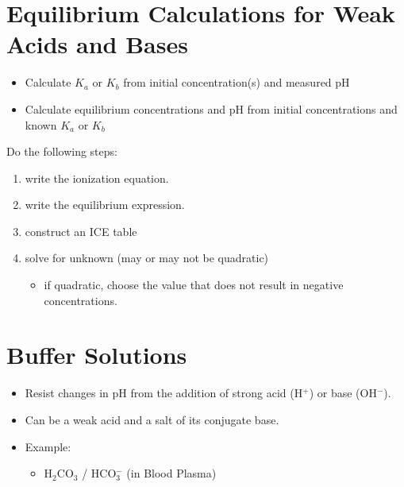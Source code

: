 \documentclass[10pt]{article}
\begin{document}
\section*{Equilibrium Calculations for Weak Acids and Bases}
\begin{itemize}
    \item Calculate $K_a$ or $K_b$ from initial concentration(s) and measured pH
    \item Calculate equilibrium concentrations and pH from initial concentrations and known $K_a$ or $K_b$
\end{itemize}
Do the following steps:
\begin{enumerate}
    \item write the ionization equation.
    \item write the equilibrium expression.
    \item construct an ICE table
    \item solve for unknown (may or may not be quadratic)
    \begin{itemize}
        \item if quadratic, choose the value that does not result in negative concentrations.
    \end{itemize}
\end{enumerate}

\section*{Buffer Solutions}
\begin{itemize}
    \item Resist changes in pH from the addition of strong acid (H$^+$) or base (OH$^-$).
    \item Can be a weak acid and a salt of its conjugate base.
    \item Example:
    \begin{itemize}
        \item H$_2$CO$_3$ / HCO$_3^-$ (in Blood Plasma)
    \end{itemize}
\end{itemize}
\end{document}
